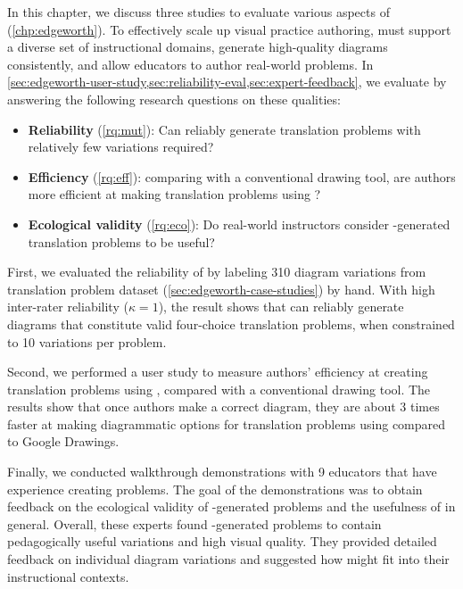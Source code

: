 In this chapter, we discuss three studies to evaluate various aspects of \Edgeworth (\cref{chp:edgeworth}). To effectively scale up visual practice authoring, \Edgeworth must support a diverse set of instructional domains, generate high-quality diagrams consistently, and allow educators to author real-world problems. In \cref{sec:edgeworth-user-study,sec:reliability-eval,sec:expert-feedback}, we evaluate \Edgeworth by answering the following research questions on these qualities:



\begin{itemize}
    \item\textbf{Reliability} (\ref{rq:mut}): Can \Edgeworth reliably generate translation problems with relatively few variations required?
    \item\textbf{Efficiency} (\ref{rq:eff}): comparing with a conventional drawing tool, are authors more efficient at making translation problems using \Edgeworth? 
    \item\textbf{Ecological validity} (\ref{rq:eco}): Do real-world instructors consider \Edgeworth-generated translation problems to be useful? 
\end{itemize}

First, we evaluated the reliability of \Edgeworth by labeling 310 diagram variations from translation problem dataset (\cref{sec:edgeworth-case-studies}) by hand. With high inter-rater reliability ($\kappa=1$), the result shows that \Edgeworth can reliably generate diagrams that constitute valid four-choice translation problems, when constrained to 10 variations per problem.

Second, we performed a user study to measure authors' efficiency at creating translation problems using \Edgeworth, compared with a conventional drawing tool. The results show that once authors make a correct diagram, they are about 3 times faster at making diagrammatic options for translation problems using \Edgeworth compared to Google Drawings. 

Finally, we conducted walkthrough demonstrations with 9 educators that have experience creating problems. The goal of the demonstrations was to obtain feedback on the ecological validity of \Edgeworth-generated problems and the usefulness of \Edgeworth in general. Overall, these experts found \Edgeworth-generated problems to contain pedagogically useful variations and high visual quality. They provided detailed feedback on individual diagram variations and suggested how \Edgeworth might fit into their instructional contexts. 

